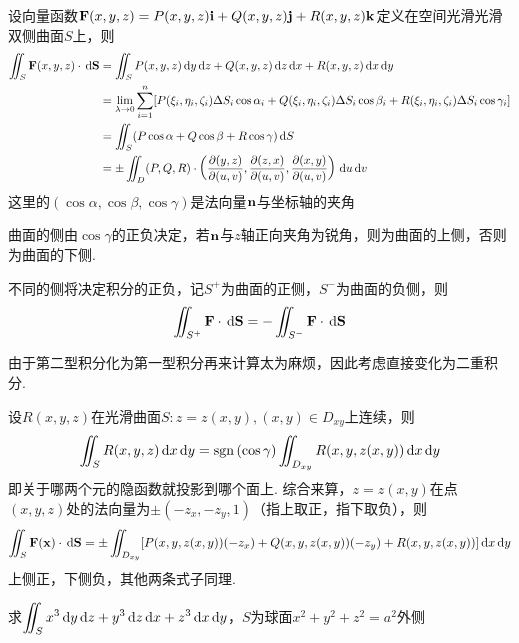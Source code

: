 \begin{definition}[第二型曲面积分]
设向量函数$\mathbf{F}(x,y,z)=P(x,y,z)\mathbf{i}+Q(x,y,z)\mathbf{j}+R(x,y,z)\mathbf{k}$定义在空间光滑光滑双侧曲面$S$上，则
\[\begin{aligned}
\iint_S\mathbf{F}(x,y,z)\cdot\,\mathrm{d}\mathbf{S}&=\iint_SP(x,y,z)\,\mathrm{d} y\,\mathrm{d} z+Q(x,y,z)\,\mathrm{d} z\,\mathrm{d} x+R(x,y,z)\,\mathrm{d} x\,\mathrm{d} y\\
&=\lim_{\lambda\to 0}\sum_{i=1}^n[P(\xi_i,\eta_i,\zeta_i)\Delta S_i\cos\alpha_i+Q(\xi_i,\eta_i,\zeta_i)\Delta S_i\cos\beta_i+R(\xi_i,\eta_i,\zeta_i)\Delta S_i\cos\gamma_i]\\
&=\iint_S(P\cos\alpha+Q\cos\beta+R\cos\gamma)\,\mathrm{d} S\\
&=\pm\iint_D (P,Q,R)\cdot\left(\dfrac{\partial (y,z)}{\partial (u,v)},\dfrac{\partial (z,x)}{\partial (u,v)},\dfrac{\partial (x,y)}{\partial (u,v)}\right)\,\mathrm{d} u\,\mathrm{d} v
\end{aligned}\]
这里的$(\cos\alpha,\cos\beta,\cos\gamma)$是法向量$\mathbf{n}$与坐标轴的夹角
\end{definition}
\par 曲面的侧由$\cos\gamma$的正负决定，若$\mathbf{n}$与$z$轴正向夹角为锐角，则为曲面的上侧，否则为曲面的下侧.
\par 不同的侧将决定积分的正负，记$S^+$为曲面的正侧，$S^-$为曲面的负侧，则
\[\iint_{S^+}\mathbf{F}\cdot\,\mathrm{d}\mathbf{S}=-\iint_{S^-}\mathbf{F}\cdot\,\mathrm{d}\mathbf{S}\]
\par 由于第二型积分化为第一型积分再来计算太为麻烦，因此考虑直接变化为二重积分.
\begin{theorem}
\label{thm:surface_integral_to_double}
设$R(x,y,z)$在光滑曲面$S:z=z(x,y),(x,y)\in {D_{xy}}$上连续，则
\[\iint_SR(x,y,z)\,\mathrm{d} x\,\mathrm{d} y=\mathrm{sgn}\,(\cos\gamma)\iint_{D_{xy}}R(x,y,z(x,y))\,\mathrm{d} x\,\mathrm{d} y\]
即关于哪两个元的隐函数就投影到哪个面上.
综合来算，$z=z(x,y)$在点$(x,y,z)$处的法向量为$\pm(-z_x,-z_y,1)$（指上取正，指下取负），则
\[\iint_S\mathbf{F}(\mathbf{x})\cdot\,\mathrm{d}\mathbf{S}=\pm\iint_{D_{xy}}[P(x,y,z(x,y))(-z_x)+Q(x,y,z(x,y))(-z_y)+R(x,y,z(x,y))]\,\mathrm{d} x\,\mathrm{d} y\]
上侧正，下侧负，其他两条式子同理.
\end{theorem}
\begin{example}
求$\displaystyle\iint_Sx^3\,\mathrm{d} y\,\mathrm{d} z+y^3\,\mathrm{d} z\,\mathrm{d} x+z^3\,\mathrm{d} x\,\mathrm{d} y$，$S$为球面$x^2+y^2+z^2=a^2$外侧
\end{example}
